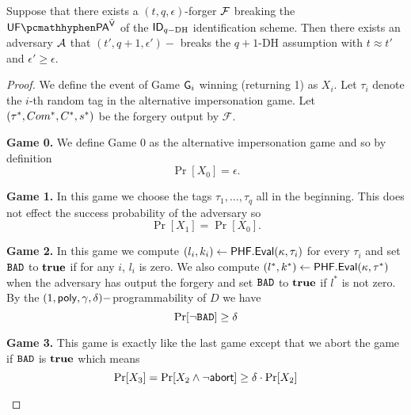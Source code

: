 \begin{theorem}
Suppose that there exists a $(t, q, \epsilon)$-forger $\mathcal{F}$ breaking the $\imp^{\IDAltV}$ of the $\mathsf{ID}_{q-\text{DH}}$ identification scheme. Then there exists an adversary $\mathcal{A}$ that $(t',q+1,\epsilon')-$ breaks the $q+1$-DH assumption with $t \approx t'$ and 
$\epsilon' \geq \epsilon.$
\end{theorem}
\begin{proof}
We define the event of Game $\mathsf{G}_i$ winning (returning 1) as $X_i$. Let $\tau_i$ denote the $i$-th random tag in the alternative impersonation game. Let $(\tau^*,Com^*, C^*, s^*)$ be the forgery output by $\mathcal{F}$.
\begin{description}[wide,itemindent=\labelsep]
\item [] \textbf{Game 0.} We define Game 0 as the alternative impersonation game and so by definition
$$\Pr[X_0] = \epsilon.$$
\item [] \textbf{Game 1.} In this game we choose the tags $\tau_1,...,\tau_q$ all in the beginning. This does not effect the success probability of the adversary so 
$$\Pr[X_1] = \Pr[X_0].$$
\item [] \textbf{Game 2.} In this game we compute
$(l_i,k_i) \leftarrow \mathsf{PHF}.\mathsf{Eval}(\kappa,\tau_i)$ for every $\tau_i$ and set $\texttt{BAD}$ to $\textbf{true}$ if for any $i$, $l_i$ is zero. We also compute $(l^*,k^*) \leftarrow \mathsf{PHF}.\mathsf{Eval}(\kappa,\tau^*)$ when the adversary has output the forgery and set $\texttt{BAD}$ to $\textbf{true}$ if $l^*$ is not zero.
\\
By the $(1, \mathsf{poly}, \gamma, \delta)-$programmability of $D$ we have
$$\Pr[\neg \texttt{BAD}] \geq \delta$$
\item [] \textbf{Game 3.} This game is exactly like the last game except that we abort the game if $\texttt{BAD}$ is $\textbf{true}$ which means
$$\Pr[X_3] = \Pr[X_2 \land \neg \mathsf{abort}] \geq \delta \cdot \Pr[X_2]$$
\end{description}


\begin{figure}[htb!]
    \centering
    \nicoresetlinenr
\end{figure}
\end{proof}

